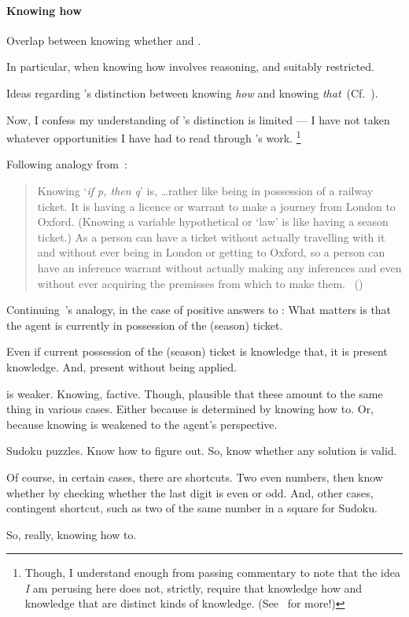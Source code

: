 \paragraph{Knowing how}

\begin{note}[Overlap]
  Overlap between knowing whether and .

  In particular, when knowing how involves reasoning, and suitably restricted.
\end{note}

\begin{note}
  Ideas regarding \citeauthor{Ryle:1946tu}'s distinction between knowing \emph{how} and knowing \emph{that}~(Cf.~\citeyear{Ryle:1946tu}).

  Now, I confess my understanding of \citeauthor{Ryle:1946tu}'s distinction is limited --- I have not taken whatever opportunities I have had to read through \citeauthor{Ryle:1946tu}'s work.%
  \footnote{
    Though, I understand enough from passing commentary to note that the idea \emph{I} am perusing here does not, strictly, require that knowledge how and knowledge that are distinct kinds of knowledge.
    (See~\textcite{Pavese:2022up} for more!)
  }

  Following analogy from~\textcite{Ryle:2009us}:

  \begin{quote}
    Knowing `\emph{if p, then q}' is, \dots rather like being in possession of a railway ticket.
    It is having a licence or warrant to make a journey from London to Oxford.
    (Knowing a variable hypothetical or `law' is like having a season ticket.)
    As a person can have a ticket without actually travelling with it and without ever being in London or getting to Oxford, so a person can have an inference warrant without actually making any inferences and even without ever acquiring the premisses from which to make them.%
    \mbox{ }\hfill\mbox{(\citeyear[250]{Ryle:2009us})}
  \end{quote}

  Continuing~\citeauthor{Ryle:2009us}'s analogy, in the case of positive answers to \qzS{}:
  What matters is that the agent is currently in possession of the (season) ticket.

  Even if current possession of the (season) ticket is knowledge that, it is present knowledge.
  And, present without being applied.
\end{note}

\begin{note}
   is weaker.
  Knowing, factive.
  Though, plausible that these amount to the same thing in various cases.
  Either because \fc{} is determined by knowing how to.
  Or, because knowing is weakened to the agent's perspective.

  Sudoku puzzles.
  Know how to figure out.
  So, know whether any solution is valid.

  Of course, in certain cases, there are shortcuts.
  Two even numbers, then know whether by checking whether the last digit is even or odd.
  And, other cases, contingent shortcut, such as two of the same number in a square for Sudoku.

  So, really, knowing how to.
\end{note}

